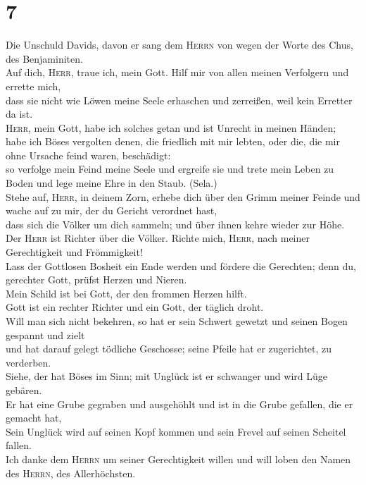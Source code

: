 \hypertarget{section-6}{%
\section{7}\label{section-6}}

 Die Unschuld Davids, davon er sang dem \textsc{Herrn} von
wegen der Worte des Chus, des Benjaminiten.\\
 Auf dich, \textsc{Herr}, traue ich, mein Gott. Hilf mir
von allen meinen Verfolgern und errette mich,\\
 dass sie nicht wie Löwen meine Seele erhaschen und
zerreißen, weil kein Erretter da ist.\\
 \textsc{Herr}, mein Gott, habe ich solches getan und ist
Unrecht in meinen Händen;\\
 habe ich Böses vergolten denen, die friedlich mit mir
lebten, oder die, die mir ohne Ursache feind waren, beschädigt:\\
 so verfolge mein Feind meine Seele und ergreife sie und
trete mein Leben zu Boden und lege meine Ehre in den Staub. (Sela.)\\
 Stehe auf, \textsc{Herr}, in deinem Zorn, erhebe dich
über den Grimm meiner Feinde und wache auf zu mir, der du Gericht
verordnet hast,\\
 dass sich die Völker um dich sammeln; und über ihnen
kehre wieder zur Höhe.\\
 Der \textsc{Herr} ist Richter über die Völker. Richte
mich, \textsc{Herr}, nach meiner Gerechtigkeit und Frömmigkeit!\\
 Lass der Gottlosen Bosheit ein Ende werden und fördere
die Gerechten; denn du, gerechter Gott, prüfst Herzen und Nieren.\\
 Mein Schild ist bei Gott, der den frommen Herzen
hilft.\\
 Gott ist ein rechter Richter und ein Gott, der täglich
droht.\\
 Will man sich nicht bekehren, so hat er sein Schwert
gewetzt und seinen Bogen gespannt und zielt\\
 und hat darauf gelegt tödliche Geschosse; seine Pfeile
hat er zugerichtet, zu verderben.\\
 Siehe, der hat Böses im Sinn; mit Unglück ist er
schwanger und wird Lüge gebären.\\
 Er hat eine Grube gegraben und ausgehöhlt und ist in die
Grube gefallen, die er gemacht hat,\\
 Sein Unglück wird auf seinen Kopf kommen und sein Frevel
auf seinen Scheitel fallen.\\
 Ich danke dem \textsc{Herrn} um seiner Gerechtigkeit
willen und will loben den Namen des \textsc{Herrn}, des Allerhöchsten.

